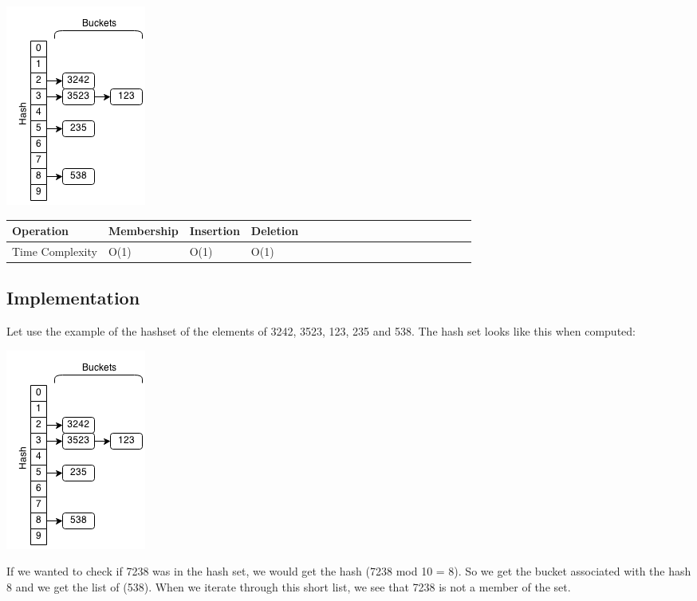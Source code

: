 \documentclass[11pt,oneside]{book}
\makeatletter
\def\maxwidth#1{\ifdim\Gin@nat@width>#1 #1\else\Gin@nat@width\fi}
\makeatother
\begin{document}
\vspace{5px}\includegraphics[width=\maxwidth{\textwidth}]{hashset.png}

\vspace{10px}\begin{tabulary}{0.4\linewidth}{|l|l|l|l|l|l|l|l|l|l|l|l|l|l|l|l|l|l|l}\hline


  Operation &
  Membership &
  Insertion &
  Deletion\\
\hline


  Time Complexity &
  O(1) &
  O(1) &
  O(1)\\

\hline\end{tabulary}

\subsection{Implementation}

Let use the example of the hashset of the elements of 3242, 3523, 123, 235 and 538. The hash set looks like this when computed:

\vspace{5px}\includegraphics[width=\maxwidth{\textwidth}]{hashset.png}

If we wanted to check if 7238 was in the hash set, we would get the hash (7238 mod 10 = 8). So we get the bucket associated with the hash 8 and we get the list of (538). When we iterate through this short list, we see that 7238 is not a member of the set.
\end{document}
